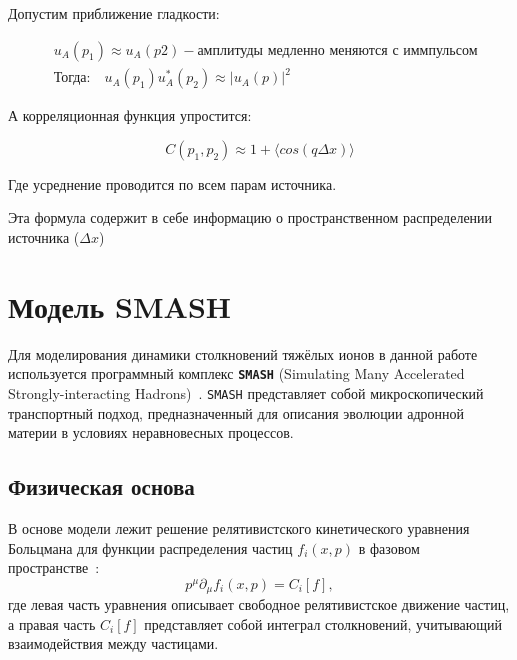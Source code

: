 \documentclass[a4paper]{extarticle}
\begin{document}
    Допустим приближение гладкости:

    \begin{align*}
        &u_A(p_1) \approx u_A(p2) 
            - \text{амплитуды медленно меняются с иммпульсом} \\
        & \text{Тогда:} 
            \quad u_A(p_1) u^{*}_{A}(p_2) \approx |u_A(p)|^2
    \end{align*}

    А корреляционная функция упростится:

    \begin{equation}
        C(p_1, p_2) \approx 1 + \langle cos(q\Delta x)\rangle
    \end{equation}

    Где усреднение проводится по всем парам источника.

    Эта формула содержит в себе информацию о пространственном распределении источника ($\Delta x$) 
\newpage

\section{Модель SMASH}
    Для моделирования динамики столкновений тяжёлых ионов 
    в данной работе используется программный комплекс \textbf{\texttt{SMASH}} 
    (Simulating Many Accelerated Strongly-interacting Hadrons)~\cite{Weil:2016zrk}. 
    \texttt{SMASH} представляет собой микроскопический транспортный подход, 
    предназначенный для описания эволюции адронной материи в условиях неравновесных процессов.

    \subsection{Физическая основа}
        В основе модели лежит решение релятивистского кинетического уравнения Больцмана 
        для функции распределения частиц $f_i(x, p)$ в фазовом пространстве~\cite{Weil:2016zrk}:
        \begin{equation}
            p^\mu \partial_\mu f_i(x, p) = C_i[f],
        \end{equation}
        где левая часть уравнения описывает свободное релятивистское движение частиц, 
        а правая часть $C_i[f]$ представляет собой интеграл столкновений, 
        учитывающий взаимодействия между частицами.
\end{document}
